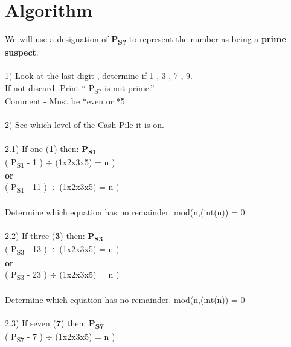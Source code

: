 \documentclass[12pt,letterpaper,oneside,titlepage]{article}
\begin{document}
\section{Algorithm}
\par
We will use a designation of \textbf{P\textsubscript{S?}} to represent the number as being a \textbf{prime suspect}.
\\ 
\\
1) Look at the last digit , determine if 1 , 3 , 7  , 9. 
\\
\hspace*{12mm}
If not discard. Print ``  P\textsubscript{S?} is not prime.''
\\
\hspace*{12mm}
Comment - Must be *even or *5
\\
\\
2) See which level of the Cash Pile it is on.
\\
\\
2.1) If one (\textbf{1}) then: \textbf{P\textsubscript{S1}}
\\
\hspace*{12mm} ( P\textsubscript{S1} - 1 ) $\div$ (1x2x3x5) = n ) 
\\
\textbf{or} 
\\
\hspace*{12mm}  ( P\textsubscript{S1} - 11 ) $\div$ (1x2x3x5) = n )
\\
\\
\hspace*{12mm} Determine which equation has no remainder. mod(n,(int(n)) = 0. 
\\
\\
2.2) If three (\textbf{3}) then: \textbf{P\textsubscript{S3}}
\\
\hspace*{12mm} ( P\textsubscript{S3} - 13 ) $\div$ (1x2x3x5) = n ) 
\\
\textbf{or} 
\\
\hspace*{12mm}( P\textsubscript{S3} - 23 ) $\div$ (1x2x3x5) = n )
\\
\\
\hspace*{12mm} Determine which equation has no remainder. mod(n,(int(n)) = 0 
\\
\\
2.3) If seven (\textbf{7}) then:  \textbf{P\textsubscript{S7}}
\\
\hspace*{12mm} ( P\textsubscript{S7} - 7 ) $\div$ (1x2x3x5) = n )
\end{document}
